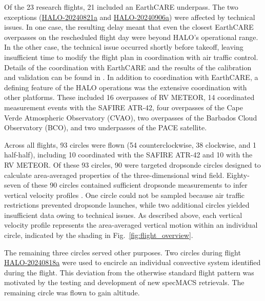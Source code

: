 \documentclass{article}
\begin{document}
Of the 23 research flights, 21 included an EarthCARE underpass. The two exceptions 
(\href{https://orcestra-campaign.org/reports/HALO-20240821a.html}{HALO-20240821a} and 
\href{https://orcestra-campaign.org/reports/HALO-20240906a.html}{HALO-20240906a}) were affected by technical issues. In one case, the resulting delay meant that even the closest EarthCARE overpasses on the rescheduled flight day were beyond HALO's operational range. In the other case, the technical issue occurred shortly before takeoff, leaving insufficient time to modify the flight plan in coordination with air traffic control. 
Details of the coordination with EarthCARE and the results of the calibration and validation can be found in \cite{grossPersistentEarthCAREUnderflight2026}.
In addition to coordination with EarthCARE, a defining feature of the HALO operations was the extensive coordination with other platforms. These included 16 overpasses of RV METEOR, 14 coordinated measurement events with the SAFIRE ATR-42, four overpasses of the Cape Verde Atmospheric Observatory (CVAO), two overpasses of the Barbados Cloud Observatory (BCO), and two underpasses of the PACE satellite.

Across all flights, 93 circles were flown (54 counterclockwise, 38 clockwise, and 1 half-half), including 10 coordinated with the SAFIRE ATR-42 and 10 with the RV METEOR. Of these 93 circles, 90 were targeted dropsonde circles designed to calculate area-averaged properties of the three-dimensional wind field. Eighty-seven of these 90 circles contained sufficient dropsonde measurements to infer vertical velocity profiles \citep{gloecknerBEACHBarbadosEastern2025}. One circle could not be sampled because air traffic restrictions prevented dropsonde launches, while two additional circles yielded insufficient data owing to technical issues. As described above, each vertical velocity profile represents the area-averaged vertical motion within an individual circle, indicated by the shading in Fig.~\ref{fig:flight_overview}.

The remaining three circles served other purposes. Two circles during flight 
\href{https://orcestra-campaign.org/reports/HALO-20240818a.html}{HALO-20240818a} were used to encircle an individual convective system identified during the flight. This deviation from the otherwise standard flight pattern was motivated by the testing and development of new specMACS retrievals. %
The remaining circle was flown to gain altitude. 
\end{document}
